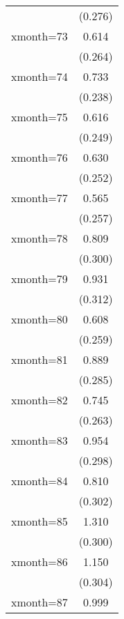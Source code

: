 \begin{table}[htbp]
\begin{tabular}{l*{1}{c}}
                    &     (0.276)         \\
[1em]
xmonth=73           &       0.614\sym{*}  \\
                    &     (0.264)         \\
[1em]
xmonth=74           &       0.733\sym{**} \\
                    &     (0.238)         \\
[1em]
xmonth=75           &       0.616\sym{*}  \\
                    &     (0.249)         \\
[1em]
xmonth=76           &       0.630\sym{*}  \\
                    &     (0.252)         \\
[1em]
xmonth=77           &       0.565\sym{*}  \\
                    &     (0.257)         \\
[1em]
xmonth=78           &       0.809\sym{**} \\
                    &     (0.300)         \\
[1em]
xmonth=79           &       0.931\sym{**} \\
                    &     (0.312)         \\
[1em]
xmonth=80           &       0.608\sym{*}  \\
                    &     (0.259)         \\
[1em]
xmonth=81           &       0.889\sym{**} \\
                    &     (0.285)         \\
[1em]
xmonth=82           &       0.745\sym{**} \\
                    &     (0.263)         \\
[1em]
xmonth=83           &       0.954\sym{**} \\
                    &     (0.298)         \\
[1em]
xmonth=84           &       0.810\sym{**} \\
                    &     (0.302)         \\
[1em]
xmonth=85           &       1.310\sym{***}\\
                    &     (0.300)         \\
[1em]
xmonth=86           &       1.150\sym{***}\\
                    &     (0.304)         \\
[1em]
xmonth=87           &       0.999\sym{***}\\

\end{tabular}
\end{table}
